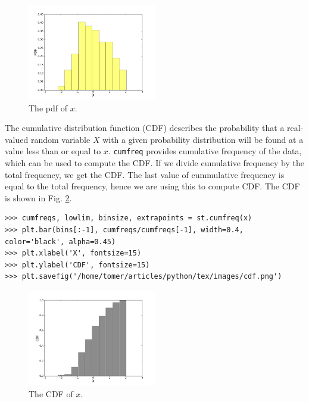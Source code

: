 \documentclass[10pt]{book}
\begin{document}
{\beforefig
\begin{figure}[h!]
  \centering
    \includegraphics[width=0.5\textwidth]{images/pdf.png}
  \caption{The pdf of $x$.}
   \label{fig:pdf}
\end{figure}
\afterfig

The cumulative distribution function (CDF) describes the probability that a real-valued random variable $X$ with a given probability distribution will be found at a value less than or equal to $x$. \verb"cumfreq" provides cumulative frequency of the data, which can be used to compute the CDF. If we divide cumulative frequency by the total frequency, we get the CDF. The last value of cummulative frequency is equal to the total frequency, hence we are using this to compute CDF. The CDF is shown in Fig. \ref{fig:cdf}. 
\beforeverb \begin{verbatim}
>>> cumfreqs, lowlim, binsize, extrapoints = st.cumfreq(x)
>>> plt.bar(bins[:-1], cumfreqs/cumfreqs[-1], width=0.4, color='black', alpha=0.45)
>>> plt.xlabel('X', fontsize=15)
>>> plt.ylabel('CDF', fontsize=15)
>>> plt.savefig('/home/tomer/articles/python/tex/images/cdf.png')
\end{verbatim} \afterverb

\beforefig
\begin{figure}[h!]
  \centering
    \includegraphics[width=0.5\textwidth]{images/cdf.png}
  \caption{The CDF of $x$.}
   \label{fig:cdf}
\end{figure}
\afterfig

}
\end{document}

